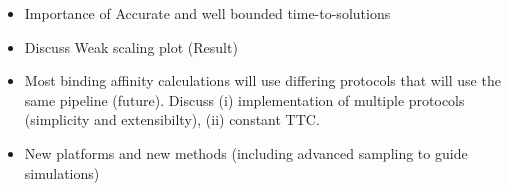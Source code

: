 
\begin{itemize}
	\item  Importance of Accurate and well bounded time-to-solutions 

	\item  Discuss Weak scaling plot (Result)

	\item  Most binding affinity calculations will use differing protocols that will use the same pipeline (future). Discuss (i) implementation of multiple protocols  (simplicity and extensibilty), (ii) constant TTC.

	\item  New platforms and new methods (including advanced sampling to guide simulations)

\end{itemize}